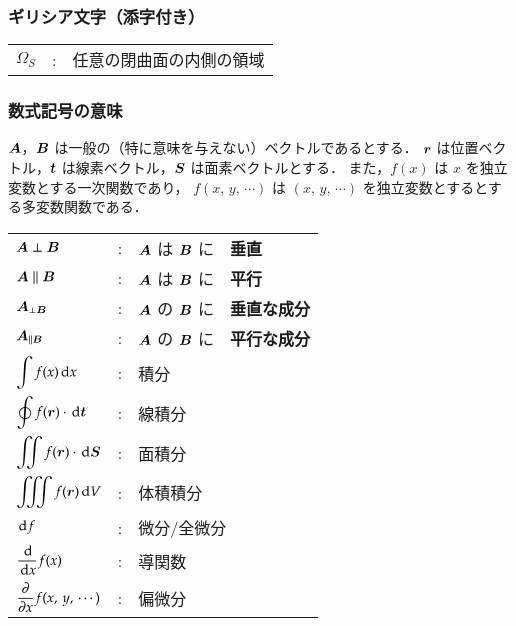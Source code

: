     \subsubsection*{ギリシア文字（添字付き）}
    \begin{tabular}{lll}
        $\Omega_{S}$            &:  & 任意の閉曲面の内側の領域                         %
    \end{tabular}

    \subsubsection*{数式記号の意味}
    $\boldsymbol{A}$，$\boldsymbol{B}$ は一般の（特に意味を与えない）ベクトルであるとする．
    $\boldsymbol{r}$ は位置ベクトル，$\boldsymbol{t}$ は線素ベクトル，$\boldsymbol{S}$ は面素ベクトルとする．
    また，$f(x)$ は $x$ を独立変数とする一次関数であり，
    $f(x,\,y,\,\cdots)$ は $(x,\,y,\,\cdots)$ を独立変数とするとする多変数関数である．\\

    \begin{tabular}{lll}
            $\boldsymbol{A} \perp \boldsymbol{B}$                                         &:  & $\boldsymbol{A}$ は $\boldsymbol{B}$ に　\textbf{垂直}                          \\
            $\boldsymbol{A} \parallel \boldsymbol{B}$                                     &:  & $\boldsymbol{A}$ は $\boldsymbol{B}$ に　\textbf{平行}                          \\
            $\boldsymbol{A}_{\perp \boldsymbol{B}}$                                       &:  & $\boldsymbol{A}$ の $\boldsymbol{B}$ に　\textbf{垂直な成分}                    \\
            $\boldsymbol{A}_{\parallel \boldsymbol{B}}$                                   &:  & $\boldsymbol{A}$ の $\boldsymbol{B}$ に　\textbf{平行な成分}                    \\
            $\displaystyle \int f(x) \,\mathrm{d} x$                         &:  & 積分         \\
            $\displaystyle \oint f(\boldsymbol{r}) \cdot \,\mathrm{d} \boldsymbol{t}$              &:  & 線積分        \\
            $\displaystyle \int\mspace{-11mu}\int f(\boldsymbol{r}) \cdot \,\mathrm{d} \boldsymbol{S}$              &:  & 面積分        \\
            $\displaystyle \int\mspace{-11mu}\int\mspace{-11mu}\int f(\boldsymbol{r}) \,\mathrm{d} V$                      &:  & 体積積分      \\
            $\,\mathrm{d} f$                                                 &:  & 微分/全微分     \\
            $\displaystyle \frac{\,\mathrm{d}}{\,\mathrm{d} x} f(x)$                  &:  & 導関数          \\
            $\displaystyle \frac{\partial}{\partial x} f(x,\, y,\, \cdots)$   &:  & 偏微分      \\
    \end{tabular}

